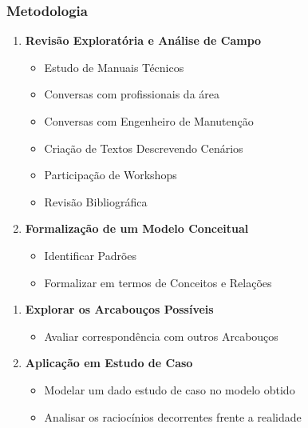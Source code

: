 \documentclass{beamer}
\begin{document}
\begin{frame}
	\frametitle{Metodologia}
	\begin{minipage}[t]{0.48\linewidth}
		\begin{enumerate}
			\item \textbf{Revisão Exploratória e Análise de Campo}
			\begin{itemize}
				\item {\footnotesize Estudo de Manuais Técnicos}
				\item {\footnotesize Conversas com profissionais da área}
				\item {\footnotesize Conversas com Engenheiro de Manutenção}
				\item {\footnotesize Criação de Textos Descrevendo Cenários}
				\item {\footnotesize Participação de Workshops}
				\item {\footnotesize Revisão Bibliográfica}
			\end{itemize} 				
			\item \textbf{Formalização de um Modelo Conceitual}
			\begin{itemize}
				\item {\footnotesize Identificar Padrões}
				\item {\footnotesize Formalizar em termos de Conceitos e Relações}
			\end{itemize}			 
		\end{enumerate}
	\end{minipage}\hfill
	\begin{minipage}[t]{0.48\linewidth}
		\begin{enumerate}
			\item \textbf{Explorar os Arcabouços Possíveis}
			\begin{itemize}
				\item {\footnotesize Avaliar correspondência com outros Arcabouços}
   			\end{itemize}			 
			\item \textbf{Aplicação em Estudo de Caso}
			\begin{itemize}
				\item {\footnotesize Modelar um dado estudo de caso no modelo obtido}
				\item {\footnotesize Analisar os raciocínios decorrentes frente a realidade}
   			\end{itemize}			 
		\end{enumerate}
	\end{minipage}	 
\end{frame}
\end{document}
